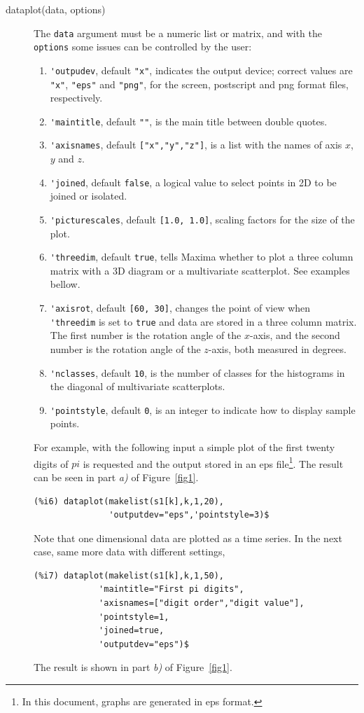 \documentclass[12pt,a4paper]{article}
\begin{document}
\begin{description}

\item[dataplot(data, options)] The \verb|data| argument must be a numeric list or matrix, and with the \verb|options| some issues can be controlled by the user:

\begin{enumerate}
\item \verb|'outpudev|, default \verb|"x"|, indicates the output device; correct values are \verb|"x"|, \verb|"eps"| and \verb|"png"|, for the screen, postscript and png format files, respectively.
\item \verb|'maintitle|, default \verb|""|, is the main title between double quotes.
\item \verb|'axisnames|, default \verb|["x","y","z"]|, is a list with the names of axis $x$, $y$ and $z$.
\item \verb|'joined|, default \verb|false|, a logical value to select points in 2D to be joined or isolated.
\item \verb|'picturescales|, default \verb|[1.0, 1.0]|, scaling factors for the size of the plot.
\item \verb|'threedim|, default \verb|true|, tells Maxima whether to plot a three column matrix with a 3D diagram or a multivariate scatterplot. See examples bellow.
\item \verb|'axisrot|, default \verb|[60, 30]|, changes the point of view when \verb|'threedim| is set to \verb|true| and  data are stored in a three column matrix. The first number is the rotation angle of the $x$-axis, and the second number is the rotation angle of the $z$-axis, both measured in degrees.
\item \verb|'nclasses|, default \verb|10|, is the number of classes for the histograms in the diagonal of multivariate scatterplots.
\item \verb|'pointstyle|, default \verb|0|, is an integer to indicate how to display sample points.
\end{enumerate}

For example, with the following input a simple plot of the first twenty digits of $pi$ is requested and the output stored in an eps file\footnote{In this document, graphs are generated in eps format.}. The result can be seen in part \emph{a)} of Figure~\ref{fig1}.
\begin{verbatim}
(%i6) dataplot(makelist(s1[k],k,1,20),
               'outputdev="eps",'pointstyle=3)$
\end{verbatim}
Note that one dimensional data are plotted as a time series. In the next case, same more data with different settings,
\begin{verbatim}
(%i7) dataplot(makelist(s1[k],k,1,50),
             'maintitle="First pi digits",
             'axisnames=["digit order","digit value"],
             'pointstyle=1,
             'joined=true,
             'outputdev="eps")$
\end{verbatim}
The result is shown in part \emph{b)} of Figure~\ref{fig1}.



\end{description}
\end{document}

